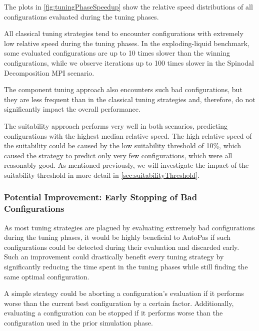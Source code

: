 The plots in \autoref{fig:tuningPhaseSpeedup} show the relative speed distributions of all configurations evaluated during the tuning phases.

All classical tuning strategies tend to encounter configurations with extremely low relative speed during the tuning phases. In the exploding-liquid benchmark, some evaluated configurations are up to 10 times slower than the winning configurations, while we observe iterations up to 100 times slower in the Spinodal Decomposition MPI scenario.

The component tuning approach also encounters such bad configurations, but they are less frequent than in the classical tuning strategies and, therefore, do not significantly impact the overall performance.

The suitability approach performs very well in both scenarios, predicting configurations with the highest median relative speed. The high relative speed of the suitability could be caused by the low suitability threshold of 10\%, which caused the strategy to predict only very few configurations, which were all reasonably good. As mentioned previously, we will investigate the impact of the suitability threshold in more detail in \autoref{sec:suitabilityThreshold}.

\subsubsection{Potential Improvement: Early Stopping of Bad Configurations}

As most tuning strategies are plagued by evaluating extremely bad configurations during the tuning phases, it would be highly beneficial to AutoPas if such configurations could be detected during their evaluation and discarded early. Such an improvement could drastically benefit every tuning strategy by significantly reducing the time spent in the tuning phases while still finding the same optimal configuration.

A simple strategy could be aborting a configuration's evaluation if it performs worse than the current best configuration by a certain factor. Additionally, evaluating a configuration can be stopped if it performs worse than the configuration used in the prior simulation phase.

